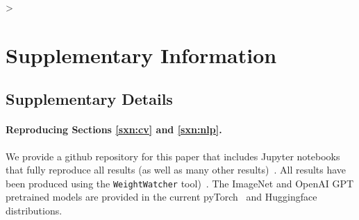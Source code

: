 >%
\section{Supplementary Information}
\label{sxn:appendix}


\subsection{Supplementary Details} 

\paragraph{Reproducing Sections \ref{sxn:cv} and \ref{sxn:nlp}. }   

We provide a github repository for this paper that includes Jupyter notebooks that fully reproduce all results (as well as many other results)~\cite{kdd20_sub_repo}.
All results have been produced using the \texttt{WeightWatcher} tool)~\cite{weightwatcher_package}.
The ImageNet and OpenAI GPT pretrained models are provided in the current 
pyTorch~\cite{pytorch} and Huggingface~\cite{huggingface} distributions.

